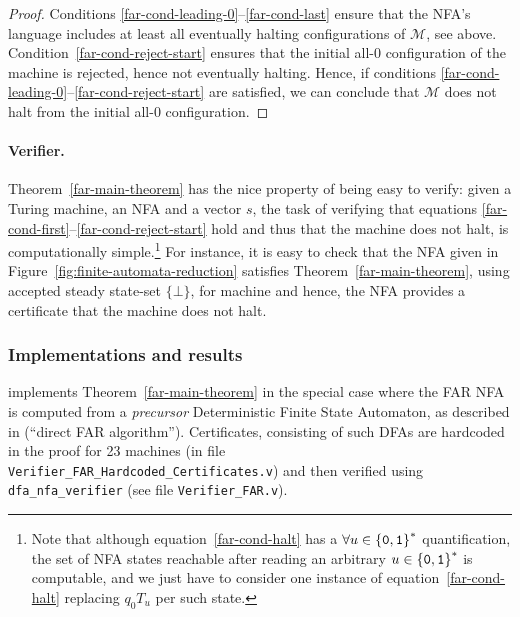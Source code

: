 \begin{proof}
    Conditions \eqref{far-cond-leading-0}--\eqref{far-cond-last} ensure that the NFA's language includes at least all eventually halting configurations of $\mathcal{M}$, see above. Condition~\eqref{far-cond-reject-start} ensures that the initial all-0 configuration of the machine is rejected, hence not eventually halting. Hence, if conditions \eqref{far-cond-leading-0}--\eqref{far-cond-reject-start} are satisfied, we can conclude that $\mathcal{M}$ does not halt from the initial all-0 configuration.
\end{proof}

\paragraph{Verifier.} Theorem~\ref{far-main-theorem} has the nice property of being easy to verify: given a Turing machine, an NFA and a vector $s$, the task of verifying that equations \eqref{far-cond-first}--\eqref{far-cond-reject-start} hold and thus that the machine does not halt, is computationally simple.\footnote{Note that although equation~\eqref{far-cond-halt} has a $\forall u\in\left\{\texttt{0},\texttt{1}\right\}^*$ quantification, the set of NFA states reachable after reading an arbitrary $u \in \left\{\texttt{0},\texttt{1}\right\}^*$ is computable, and we just have to consider one instance of equation~\eqref{far-cond-halt} replacing $q_0 T_u$ per such state.} For instance, it is easy to check that the NFA given in Figure~\ref{fig:finite-automata-reduction} satisfies Theorem~\ref{far-main-theorem}, using accepted steady state-set $\{\bot\}$, for machine  and hence, the NFA provides a certificate that the machine does not halt.



\subsubsection{Implementations and results}\label{sec:FAR:results}

\CoqBB implements Theorem~\ref{far-main-theorem} in the special case where the FAR NFA is computed from a \textit{precursor} Deterministic Finite State Automaton, as described in \cite{bbchallenge_part1} (``direct FAR algorithm''). Certificates, consisting of such DFAs are hardcoded in the proof for 23 machines (in file\\ \texttt{Verifier\_FAR\_Hardcoded\_Certificates.v}) and then verified using \texttt{dfa\_nfa\_verifier} (see file \texttt{Verifier\_FAR.v}).

